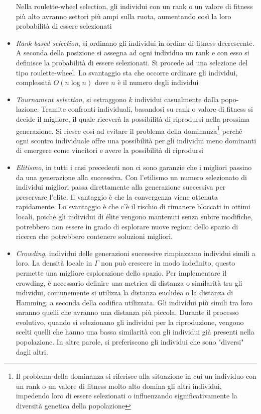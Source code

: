 \begin{itemize}
    Nella roulette-wheel selection, gli individui con un rank o un valore di fitness più alto avranno settori più ampi sulla ruota, aumentando così la loro probabilità di essere selezionati
    \item \textit{Rank-based selection}, si ordinano gli individui in ordine di fitness decrescente. A seconda della posizione si assegna ad ogni individuo un rank e con esso si definisce la probabilità di essere selezionati. Si procede ad una selezione del tipo roulette-wheel. Lo svantaggio sta che occorre ordinare gli individui, complessità $O(n \log n)$ dove $n$ è il numero degli individui
    \item \textit{Tournament selection}, si estraggono $k$ individui casualmente dalla popo- lazione. Tramite confronti individuali, basandosi su rank o valore di fitness si decide il migliore, il quale riceverà la possibilità di riprodursi nella prossima generazione. Si riesce così ad evitare il problema della dominanza\footnote{Il problema della dominanza si riferisce alla situazione in cui un individuo con un rank o un valore di fitness molto alto domina gli altri individui, impedendo loro di essere selezionati o influenzando significativamente la diversità genetica della popolazione} perché ogni scontro individuale offre una possibilità per gli individui meno dominanti di emergere come vincitori e avere la possibilità di riprodursi
    \item \textit{Elitismo}, in tutti i casi precedenti non ci sono garanzie che i migliori passino da una generazione alla successiva. Con l’etilismo un numero selezionato di individui migliori passa direttamente alla generazione successiva per preservare l’elite. Il vantaggio è che la convergenza viene ottenuta rapidamente. Lo svantaggio è che c’è il rischio di rimanere bloccati in ottimi locali, poiché gli individui di élite vengono mantenuti senza subire modifiche, potrebbero non essere in grado di esplorare nuove regioni dello spazio di ricerca che potrebbero contenere soluzioni migliori.
    \item \textit{Crowding}, individui delle generazioni successive rimpiazzano individui simili a loro. La densità locale in $\Gamma$ non può crescere in modo indefinito, questo permette una migliore esplorazione dello spazio. Per implementare il crowding, è necessario definire una metrica di distanza o similarità tra gli individui, comunemente si utilizza la distanza euclidea o la distanza di Hamming, a seconda della codifica utilizzata. Gli individui più simili tra loro saranno quelli che avranno una distanza più piccola. Durante il processo evolutivo, quando si selezionano gli individui per la riproduzione, vengono scelti quelli che hanno una bassa similarità con gli individui già presenti nella popolazione. In altre parole, si preferiscono gli individui che sono "diversi" dagli altri.
\end{itemize}

